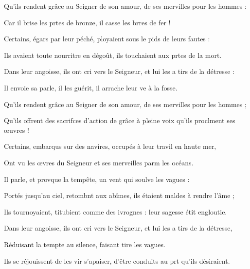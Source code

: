 \item Qu’ils rendent grâce au Seigner de son amour,\psstar{} de ses mervilles pour les hommes :
\item Car il brise les prtes de bronze,\psstar{} il casse les brres de fer !
\item Certains, égars par leur péché,\psstar{} ployaient sous le pids de leurs fautes :
\item Ils avaient toute nourritre en dégoût,\psstar{} ils touchaient aux prtes de la mort.
\item Dans leur angoisse, ils ont cri vers le Seigneur,\psstar{} et lui les a tirs de la détresse :
\item Il envoie sa parle, il les guérit,\psstar{} il arrache leur ve à la fosse.
\item Qu’ils rendent grâce au Seigner de son amour,\psstar{} de ses mervilles pour les hommes ;
\item Qu’ils offrent des sacrifces d’action de grâce\psstar{} à pleine voix qu’ils proclment ses œuvres !
\item Certains, embarqus sur des navires,\psstar{} occupés à leur travil en haute mer,
\item Ont vu les œvres du Seigneur\psstar{} et ses merveilles parm les océans.
\item Il parle, et provque la tempête,\psstar{} un vent qui soulve les vagues :
\item Portés jusqu’au ciel, retombnt aux abîmes,\psstar{} ils étaient maldes à rendre l’âme ;
\item Ils tournoyaient, titubient comme des ivrognes :\psstar{} leur sagesse étit engloutie.
\item Dans leur angoisse, ils ont cri vers le Seigneur,\psstar{} et lui les a tirs de la détresse,
\item Réduisant la tempte au silence,\psstar{} faisant tire les vagues.
\item Ils se réjouissent de les vir s’apaiser,\psstar{} d’être conduits au prt qu’ils désiraient.